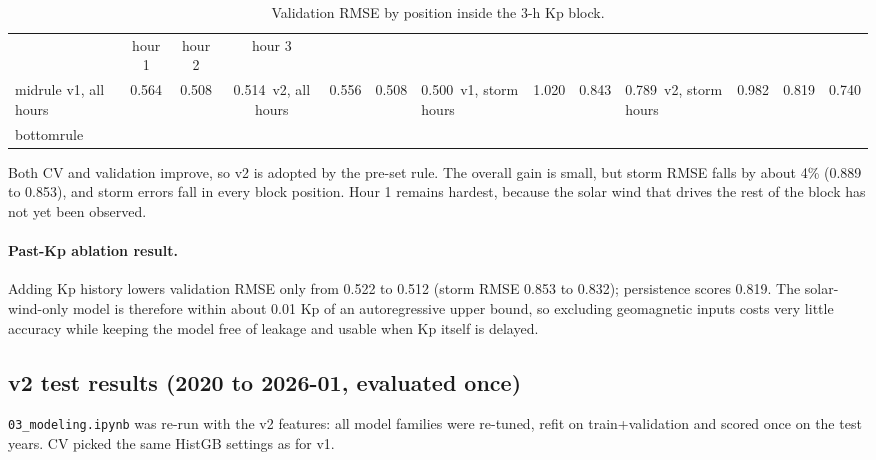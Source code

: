 \documentclass[11pt,a4paper]{article}
\newcommand{\code}[1]{\texttt{#1}}
\begin{document}
\begin{table}[H]\centering
\caption{Validation RMSE by position inside the 3-h Kp block.}\label{tab:v1v2pos}
\begin{tabular}{lccc}\toprule
 & hour 1 & hour 2 & hour 3\\midrule
v1, all hours & 0.564 & 0.508 & 0.514\
v2, all hours & 0.556 & 0.508 & 0.500\
v1, storm hours & 1.020 & 0.843 & 0.789\
v2, storm hours & 0.982 & 0.819 & 0.740\\bottomrule
\end{tabular}
\end{table}

Both CV and validation improve, so v2 is adopted by the pre-set rule. The overall gain is small, but storm RMSE
falls by about 4\% (0.889 to 0.853), and storm errors fall in every block position. Hour 1 remains hardest,
because the solar wind that drives the rest of the block has not yet been observed.

\paragraph{Past-Kp ablation result.} Adding Kp history lowers validation RMSE only from 0.522 to 0.512 (storm RMSE
0.853 to 0.832); persistence scores 0.819. The solar-wind-only model is therefore within about 0.01 Kp of an
autoregressive upper bound, so excluding geomagnetic inputs costs very little accuracy while keeping the model
free of leakage and usable when Kp itself is delayed.

\subsection{v2 test results (2020 to 2026-01, evaluated once)}
\code{03\_modeling.ipynb} was re-run with the v2 features: all model families were re-tuned, refit on
train+validation and scored once on the test years. CV picked the same HistGB settings as for v1.
\end{document}
